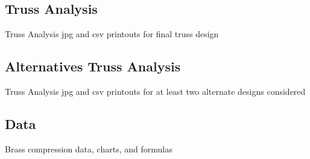 \documentclass{article}
\let\Oldsubsection\subsection
\renewcommand{\subsection}{\FloatBarrier\Oldsubsection}
\begin{document}
  \newpage
  
  \subsection{Truss Analysis}
  
  Truss Analysis jpg and csv printouts for final truss design
  
  \newpage
  
  \subsection{Alternatives Truss Analysis}
  
  Truss Analysis jpg and csv printouts for at least two alternate designs considered
  
  \newpage
  
  \subsection{Data}
  
  Brass compression data, charts, and formulas
  
  \newpage
  
  \printbibliography
  
  
\end{document}
